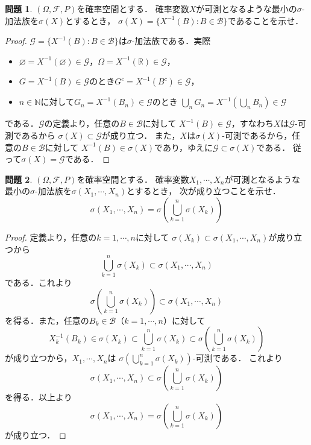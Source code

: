 \documentclass{jsarticle}
\theoremstyle{definition}
\newtheorem{qst}{問題}
\begin{document}
\begin{qst}
$(\Omega,\mathcal{F},P)$を確率空間とする．
確率変数$X$が可測となるような最小の$\sigma$-加法族を$\sigma(X)$とするとき，
$\sigma(X)=\{X^{-1}(B):B\in\mathcal{B}\}$であることを示せ．
\end{qst}
\begin{proof}
$\mathcal{G}=\{X^{-1}(B):B\in\mathcal{B}\}$は$\sigma$-加法族である．実際
\begin{itemize}
\item$\varnothing=X^{-1}(\varnothing)\in\mathcal{G}$，$\Omega=X^{-1}(\mathbb{R})\in\mathcal{G}$，
\item$G=X^{-1}(B)\in\mathcal{G}$のとき$G^c=X^{-1}(B^c)\in\mathcal{G}$，
\item$n\in\mathbb{N}$に対して$G_n=X^{-1}(B_n)\in\mathcal{G}$のとき
$\bigcup_nG_n=X^{-1}(\bigcup_nB_n)\in\mathcal{G}$
\end{itemize}
である．$\mathcal{G}$の定義より，任意の$B\in\mathcal{B}$に対して
$X^{-1}(B)\in\mathcal{G}$，すなわち$X$は$\mathcal{G}$-可測であるから
$\sigma(X)\subset\mathcal{G}$が成り立つ．
また，$X$は$\sigma(X)$-可測であるから，任意の$B\in\mathcal{B}$に対して
$X^{-1}(B)\in\sigma(X)$であり，ゆえに$\mathcal{G}\subset\sigma(X)$である．
従って$\sigma(X)=\mathcal{G}$である．
\end{proof}

\begin{qst}
$(\Omega,\mathcal{F},P)$を確率空間とする．
確率変数$X_1,\cdots,X_n$が可測となるような
最小の$\sigma$-加法族を$\sigma(X_1,\cdots,X_n)$とするとき，
次が成り立つことを示せ．
\[ \sigma(X_1,\cdots,X_n)=\sigma\left(\bigcup_{k=1}^n\sigma(X_k)\right) \]
\end{qst}
\begin{proof}
定義より，任意の$k=1,\cdots,n$に対して
$\sigma(X_k)\subset\sigma(X_1,\cdots,X_n)$が成り立つから
\[ \bigcup_{k=1}^n\sigma(X_k)\subset\sigma(X_1,\cdots,X_n) \]
である．これより
\[ \sigma\left(\bigcup_{k=1}^n\sigma(X_k)\right)\subset\sigma(X_1,\cdots,X_n) \]
を得る．また，任意の$B_k\in\mathcal{B}$（$k=1,\cdots,n$）に対して
\[ X_k^{-1}(B_k)\in\sigma(X_k)\subset\bigcup_{k=1}^n\sigma(X_k)
\subset\sigma\left(\bigcup_{k=1}^n\sigma(X_k)\right) \]
が成り立つから，$X_1,\cdots,X_n$は
$\displaystyle\sigma\left(\bigcup_{k=1}^n\sigma(X_k)\right)$-可測である．
これより
\[ \sigma(X_1,\cdots,X_n)\subset\sigma\left(\bigcup_{k=1}^n\sigma(X_k)\right) \]
を得る．以上より
\[ \sigma(X_1,\cdots,X_n)=\sigma\left(\bigcup_{k=1}^n\sigma(X_k)\right) \]
が成り立つ．
\end{proof}
\end{document}
